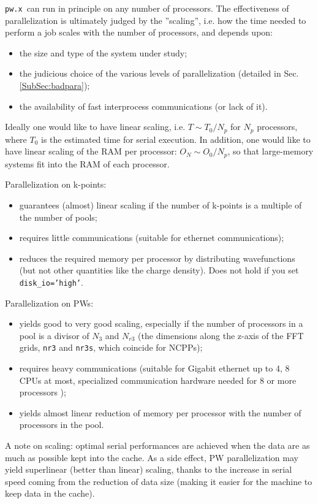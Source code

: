 \documentclass[12pt,a4paper]{article}
\def\pwx{\texttt{pw.x}}
\begin{document}
\pwx\ can run in principle on any number of processors.
The effectiveness of parallelization is ultimately judged by the 
''scaling'', i.e. how the time needed to perform a job scales
 with the number of processors, and depends upon:
\begin{itemize}
\item the size and type of the system under study;
\item the judicious choice of the various levels of parallelization 
(detailed in Sec.\ref{SubSec:badpara});
\item the availability of fast interprocess communications (or lack of it).
\end{itemize}
Ideally one would like to have linear scaling, i.e. $T \sim T_0/N_p$ for 
$N_p$ processors, where $T_0$ is the estimated time for serial execution.
 In addition, one would like to have linear scaling of
the RAM per processor: $O_N \sim O_0/N_p$, so that large-memory systems
fit into the RAM of each processor.

Parallelization on k-points:
\begin{itemize}
\item guarantees (almost) linear scaling if the number of k-points
is a multiple of the number of pools;
\item requires little communications (suitable for ethernet communications);
\item reduces the required memory per processor by distributing wavefunctions
(but not other quantities like the charge density). Does not hold if you set 
  \texttt{disk\_io='high'}.
\end{itemize}
Parallelization on PWs:
\begin{itemize}
\item yields good to very good scaling, especially if the number of processors
in a pool is a divisor of $N_3$ and $N_{r3}$ (the dimensions along the z-axis 
of the FFT grids, \texttt{nr3} and \texttt{nr3s}, which coincide for NCPPs);
\item requires heavy communications (suitable for Gigabit ethernet up to 
4, 8 CPUs at most, specialized communication hardware needed for 8 or more
processors );
\item yields almost linear reduction of memory per processor with the number
of processors in the pool.
\end{itemize}

A note on scaling: optimal serial performances are achieved when the data are
as much as possible kept into the cache. As a side effect, PW
parallelization may yield superlinear (better than linear) scaling,
thanks to the increase in serial speed coming from the reduction of data size 
(making it easier for the machine to keep data in the cache).
\end{document}
